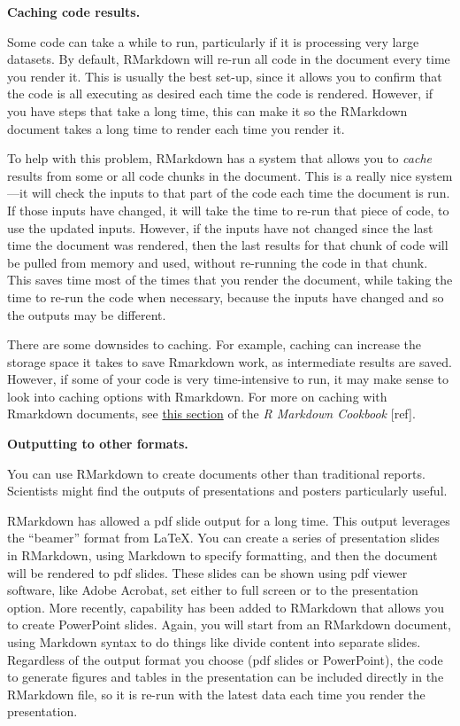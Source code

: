 \documentclass[]{tufte-book}
\begin{document}
\textbf{Caching code results.}

Some code can take a while to run, particularly if it is processing very large
datasets. By default, RMarkdown will re-run all code in the document every time
you render it. This is usually the best set-up, since it allows you to confirm
that the code is all executing as desired each time the code is rendered.
However, if you have steps that take a long time, this can make it so the
RMarkdown document takes a long time to render each time you render it.

To help with this problem, RMarkdown has a system that allows you to \emph{cache}
results from some or all code chunks in the document. This is a really nice
system---it will check the inputs to that part of the code each time the
document is run. If those inputs have changed, it will take the time to re-run
that piece of code, to use the updated inputs. However, if the inputs have not
changed since the last time the document was rendered, then the last results for
that chunk of code will be pulled from memory and used, without re-running the
code in that chunk. This saves time most of the times that you render the
document, while taking the time to re-run the code when necessary, because the
inputs have changed and so the outputs may be different.

There are some downsides to caching. For example, caching can increase the
storage space it takes to save Rmarkdown work, as intermediate results are
saved. However, if some of your code is very time-intensive to run, it may make
sense to look into caching options with Rmarkdown. For more on caching with
Rmarkdown documents, see \href{https://bookdown.org/yihui/rmarkdown-cookbook/cache.html}{this
section} of the \emph{R
Markdown Cookbook} {[}ref{]}.

\textbf{Outputting to other formats.}

You can use RMarkdown to create documents other than traditional reports.
Scientists might find the outputs of presentations and posters particularly
useful.

RMarkdown has allowed a pdf slide output for a long time. This output leverages
the ``beamer'' format from LaTeX. You can create a series of presentation slides
in RMarkdown, using Markdown to specify formatting, and then the document will
be rendered to pdf slides. These slides can be shown using pdf viewer software,
like Adobe Acrobat, set either to full screen or to the presentation option.
More recently, capability has been added to RMarkdown that allows you to create
PowerPoint slides. Again, you will start from an RMarkdown document, using
Markdown syntax to do things like divide content into separate slides.
Regardless of the output format you choose (pdf slides or PowerPoint), the code
to generate figures and tables in the presentation can be included directly in
the RMarkdown file, so it is re-run with the latest data each time you render
the presentation.
\end{document}
